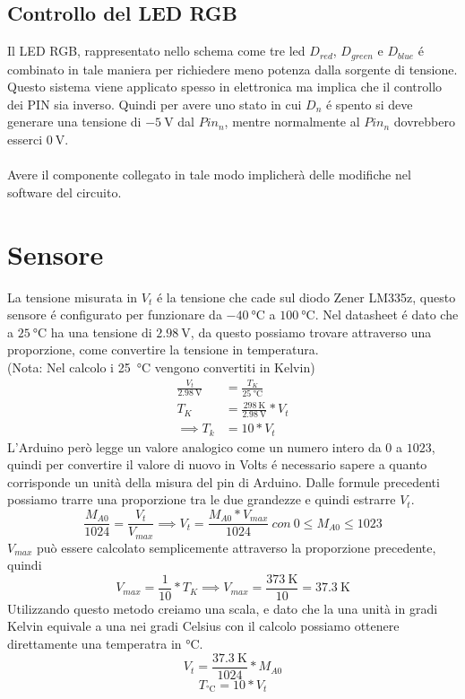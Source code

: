 \documentclass[a4paper]{article}
\begin{document}
	\subsection{Controllo del LED RGB}
	Il LED RGB, rappresentato nello schema come tre led $D_{red}$, $D_{green}$ e $D_{blue}$
	é combinato in tale maniera per richiedere meno potenza dalla sorgente di tensione.
	Questo sistema viene applicato spesso in elettronica ma implica che il controllo dei PIN sia
	inverso. Quindi per avere uno stato in cui $D_n$ é spento si deve generare una tensione
	di $\SI{-5}{\volt}$ dal $Pin_n$, mentre normalmente al $Pin_n$ dovrebbero esserci 
	$\SI{0}{\volt}$.\\\\
	Avere il componente collegato in tale modo implicherà delle modifiche nel software
	del circuito.
	
	\section{Sensore}
	La tensione misurata in $V_t$ é la tensione che cade sul diodo Zener LM335z, questo
	sensore é configurato per funzionare da $\SI{-40}{\celsius}$ a $\SI{+100}{\celsius}$.
	Nel datasheet é dato che a $\SI{+25}{\celsius}$ ha una tensione di $\SI{2,98}{\volt}$,
	da questo possiamo trovare attraverso una proporzione, come convertire la tensione in
	temperatura.\\
	(Nota: Nel calcolo i \SI{25}{\celsius} vengono convertiti in Kelvin)
	\begin{align*}
		\frac{V_t}{\SI{2.98}{\volt}} &= \frac{T_K}{\SI{25}{\celsius}}\\
		T_K &= \frac{\SI{298}{\kelvin}}{\SI{2.98}{\volt}}*V_t\\
		\implies T_k &= 10*V_t
	\end{align*}
	L'Arduino però legge un valore analogico come un numero intero da $0$ a $1023$, quindi per
	convertire il valore di nuovo in Volts é necessario sapere a quanto corrisponde un unità
	della misura del pin di Arduino. Dalle formule precedenti possiamo trarre una proporzione
	tra le due grandezze e quindi estrarre $V_t$.
	$$\frac{M_{A0}}{1024} = \frac{V_t}{V_{max}} \implies V_t = \frac{M_{A0} * V_{max}}{1024} ~con~0\leq M_{A0} \leq 1023$$
	$V_{max}$ può essere calcolato semplicemente attraverso la proporzione precedente, quindi
	$$V_{max} = \frac{1}{10}*T_K \implies V_{max} = \frac{\SI{373}{\kelvin}}{10} = \SI{37.3}{\kelvin}$$
	Utilizzando questo metodo creiamo una scala, e dato che la una unità in gradi Kelvin equivale a una nei
	gradi Celsius con il calcolo possiamo ottenere direttamente una temperatra in \si{\celsius}.
	$$V_t = \frac{\SI{37.3}{\kelvin}}{1024} * M_{A0}$$
	$$T_{\si{\celsius}} = 10 * V_t$$
\end{document}
